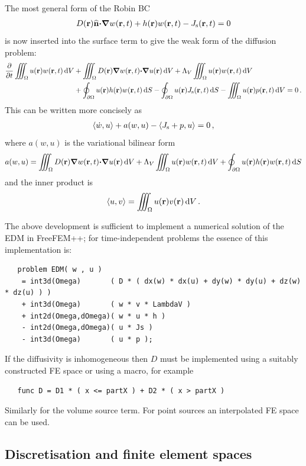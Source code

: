 \documentclass[a4paper]{article}
\numberwithin{equation}{section}
\providecommand\oiint{\oint}
\begin{document}
The most general form of the Robin BC
\begin{align}
D(\boldsymbol{\mathrm{r}})\widehat{\boldsymbol{\mathrm{n}}}{\boldsymbol{\mathrm{\cdot}}}{\boldsymbol{\mathrm{\nabla}}} w(\boldsymbol{\mathrm{r}},t) +h(\boldsymbol{\mathrm{r}}) w(\boldsymbol{\mathrm{r}},t)-J_{\mathrm{s}}(\boldsymbol{\mathrm{r}},t)=0
\end{align}
is now inserted into the surface term to give the weak form of the diffusion
problem:
\begin{align}
\frac{{\partial}}{{\partial}t}\iiint_{\Omega} u\pr w\prt\dif{V}
&+\iiint_{\Omega} D\pr{\vnabla}w\prt{\vcdot}{\vnabla}u\pr\dif{V}
+\Lambda_V \iiint_{\Omega} u\pr w\prt\dif{V} \nonumber \\
&+\oiint_{\partial\Omega} u\pr h\pr w\prt\dif{S}
-\oiint_{\partial\Omega} u\pr J_\rs\prt\dif{S}
-\iiint_{\Omega} u\pr p\prt\dif{V}=0\,.
\end{align}
This can be written more concisely as
\begin{align}
\langle \dot{w},u \rangle + a(w,u) - \langle J_{\mathrm{s}}+p ,u \rangle = 0\,,
\end{align}
where $a(w,u)$ is the variational bilinear form
\begin{align}
a(w,u)
=\iiint_{\Omega} D\pr{\vnabla}w\prt{\vcdot}{\vnabla}u\pr\dif{V}
+\Lambda_V \iiint_{\Omega} u\pr w\prt\dif{V}
+\oiint_{\partial\Omega} u\pr h\pr w\prt\dif{S}
\end{align}
and the inner product is
\begin{align}
\langle u , v \rangle
= \iiint_{\Omega} u(\boldsymbol{\mathrm{r}}) v(\boldsymbol{\mathrm{r}}) \,\mathrm{d}{V}\,.
\end{align}

The above development is sufficient to implement a numerical solution of the EDM in FreeFEM++; for 
time-independent problems the essence of this implementation is:
\begin{verbatim}
   problem EDM( w , u ) 
    = int3d(Omega)       ( D * ( dx(w) * dx(u) + dy(w) * dy(u) + dz(w) * dz(u) ) )
    + int3d(Omega)       ( w * v * LambdaV )
    + int2d(Omega,dOmega)( w * u * h )   
    - int2d(Omega,dOmega)( u * Js )
    - int3d(Omega)       ( u * p );
\end{verbatim}
If the diffusivity is inhomogeneous then $D$ must be implemented using a
suitably constructed FE space or using a macro, for example
\begin{verbatim}
   func D = D1 * ( x <= partX ) + D2 * ( x > partX )  
\end{verbatim}
Similarly for the volume source term. For point sources an interpolated 
FE space can be used.

\subsection[Discretisation and finite element spaces]{Discretisation and finite element spaces}
\label{sc:fem:discrete}
\end{document}
